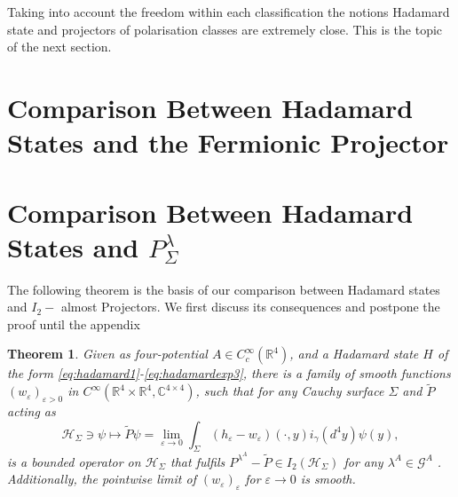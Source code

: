 \documentclass[a4paper,11pt]{article}
\newtheorem{thm}{Theorem}
\begin{document}
Taking into account the freedom within each classification the notions Hadamard state and  projectors of polarisation classes are extremely close. 
This is the topic of the next section.

\section{Comparison Between Hadamard States and the Fermionic Projector}\label{sec:comparison hadamard fermion}

\section{Comparison Between Hadamard States and \(P^\lambda_\Sigma\)}\label{sec:comparison hadamard pol}

The following theorem is the basis of our comparison between Hadamard states and \(I_2-\) almost Projectors. We first
discuss its consequences and postpone the proof until the appendix 


\begin{thm}\label{thm:hadamard=>Pol}
Given as four-potential \(A\in C_c^\infty (\mathbb{R}^4)\), and a Hadamard state \(H\) of the form 
\eqref{eq:hadamard1}-\eqref{eq:hadamardexp3}, there is a family of smooth functions 
\((w_\varepsilon)_{\varepsilon>0}\) in \( C^\infty(\mathbb{R}^4\times \mathbb{R}^4,\mathbb{C}^{4\times 4})\), such that for any Cauchy surface 
\(\Sigma\) and \(\tilde{P}\) acting as
\begin{equation}
\mathcal{H}_{\Sigma} \ni \psi \mapsto \tilde{P}\psi= \lim_{\varepsilon \rightarrow 0} \int_{\Sigma} (h_\varepsilon - w_\varepsilon)(\cdot,y)i_{\gamma}(d^4y) \psi(y),
\end{equation}
is a bounded operator on \(\mathcal{H}_\Sigma\) that fulfils \(P^{\lambda^A}-\tilde{P}\in I_2(\mathcal{H}_\Sigma)\) for any \(\lambda^A\in \mathcal{G}^A\) . 
Additionally, the pointwise limit of \((w_\varepsilon)_{\varepsilon}\) for \(\varepsilon \rightarrow 0\) is smooth.
\end{thm}
\end{document}
